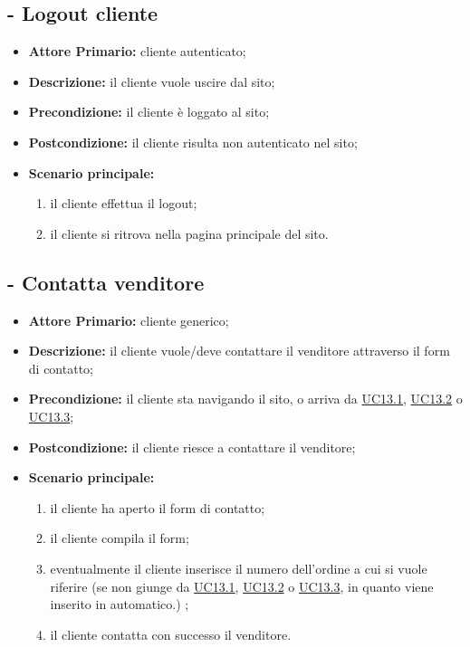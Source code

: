 \stepUserCase
\subsection{ - Logout cliente}
\begin{itemize}
    \item \textbf{Attore Primario:} cliente autenticato;
    \item \textbf{Descrizione:} il cliente vuole uscire dal sito;
    \item \textbf{Precondizione:} il cliente è loggato al sito;
    \item \textbf{Postcondizione:} il cliente risulta non autenticato nel sito;
    \item \textbf{Scenario principale:}
    \begin{enumerate}
        \item il cliente effettua il logout;
        \item il cliente si ritrova nella pagina principale del sito.
    \end{enumerate}
\end{itemize}

\stepUserCase
\subsection{ - Contatta venditore} 
\begin{itemize}
    \item \textbf{Attore Primario:} cliente generico;
    \item \textbf{Descrizione:} il cliente vuole/deve contattare il venditore attraverso il form di contatto;
    \item \textbf{Precondizione:} il cliente sta navigando il sito, o arriva da \hyperref[UC13.1]{UC13.1}, \hyperref[UC13.2]{UC13.2} o \hyperref[UC13.3]{UC13.3};
    \item \textbf{Postcondizione:} il cliente riesce a contattare il venditore;
    \item \textbf{Scenario principale:}
    \begin{enumerate}
        \item il cliente ha aperto il form di contatto;
        \item il cliente compila il form;
        \item eventualmente il cliente inserisce il numero dell'ordine a cui si vuole riferire (se non giunge da \hyperref[UC13.1]{UC13.1}, \hyperref[UC13.2]{UC13.2} o \hyperref[UC13.3]{UC13.3}, in quanto viene inserito in automatico.) ;
        \item il cliente contatta con successo il venditore.
    \end{enumerate}
\end{itemize}